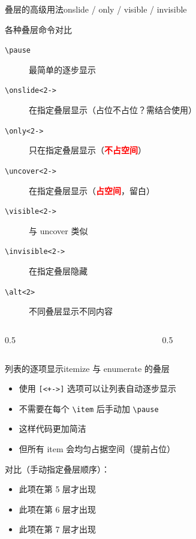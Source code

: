 \documentclass[UTF8,11pt,aspectratio=169]{beamer}
\newcommand{\important}[1]{\textcolor{red}{\textbf{#1}}}
\begin{document}
\begin{frame}{叠层的高级用法}{onslide / only / visible / invisible}
    \begin{block}{各种叠层命令对比}
        \begin{description}
            \item[\texttt{\textbackslash pause}] 最简单的逐步显示
            \item[\texttt{\textbackslash onslide<2->}] 在指定叠层显示（占位不占位？需结合使用）
            \item[\texttt{\textbackslash only<2->}] 只在指定叠层显示（\important{不占空间}）
            \item[\texttt{\textbackslash uncover<2->}] 在指定叠层显示（\important{占空间}，留白）
            \item[\texttt{\textbackslash visible<2->}] 与 uncover 类似
            \item[\texttt{\textbackslash invisible<2->}] 在指定叠层隐藏
            \item[\texttt{\textbackslash alt<2>}] 不同叠层显示不同内容
        \end{description}
    \end{block}

    \begin{columns}[T]
        \begin{column}{0.5\textwidth}
        \end{column}
        \begin{column}{0.5\textwidth}
        \end{column}
    \end{columns}
\end{frame}

\begin{frame}{列表的逐项显示}{itemize 与 enumerate 的叠层}
    \begin{itemize}[<+->]
        \item 使用 \texttt{[<+->]} 选项可以让列表自动逐步显示
        \item 不需要在每个 \texttt{\textbackslash item} 后手动加 \texttt{\textbackslash pause}
        \item 这样代码更加简洁
        \item 但所有 item 会均匀占据空间（提前占位）
    \end{itemize}

    \vspace{0.3cm}
    对比（手动指定叠层顺序）：
    \begin{itemize}
        \item<5-> 此项在第 5 层才出现
        \item<6-> 此项在第 6 层才出现
        \item<7-> 此项在第 7 层才出现
    \end{itemize}
\end{frame}
\end{document}
